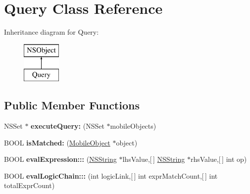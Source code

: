 \hypertarget{interface_query}{
\section{\-Query \-Class \-Reference}
\label{interface_query}
}
\-Inheritance diagram for \-Query\-:\begin{figure}[H]
\begin{center}
\leavevmode
\includegraphics[height=2.000000cm]{interface_query}
\end{center}
\end{figure}
\subsection*{\-Public \-Member \-Functions}
\begin{DoxyCompactItemize}
\item 
\hypertarget{interface_query_ae447cab5f85a009fb85e4ddb6e947250}{
\-N\-S\-Set $\ast$ {\bfseries execute\-Query\-:} (\-N\-S\-Set $\ast$mobile\-Objects)}
\label{interface_query_ae447cab5f85a009fb85e4ddb6e947250}

\item 
\hypertarget{interface_query_a425e041301937559713ac183ad50277f}{
\-B\-O\-O\-L {\bfseries is\-Matched\-:} (\hyperlink{interface_mobile_object}{\-Mobile\-Object} $\ast$object)}
\label{interface_query_a425e041301937559713ac183ad50277f}

\item 
\hypertarget{interface_query_ad602c4a9cc9d2400c4750e44095003a4}{
\-B\-O\-O\-L {\bfseries eval\-Expression\-:::} (\hyperlink{class_n_s_string}{\-N\-S\-String} $\ast$lhs\-Value,\mbox{[}$\,$\mbox{]} \hyperlink{class_n_s_string}{\-N\-S\-String} $\ast$rhs\-Value,\mbox{[}$\,$\mbox{]} int op)}
\label{interface_query_ad602c4a9cc9d2400c4750e44095003a4}

\item 
\hypertarget{interface_query_a54504edb7dfa29de7509b1f7688fd1fc}{
\-B\-O\-O\-L {\bfseries eval\-Logic\-Chain\-:::} (int logic\-Link,\mbox{[}$\,$\mbox{]} int expr\-Match\-Count,\mbox{[}$\,$\mbox{]} int total\-Expr\-Count)}
\label{interface_query_a54504edb7dfa29de7509b1f7688fd1fc}

\end{DoxyCompactItemize}
